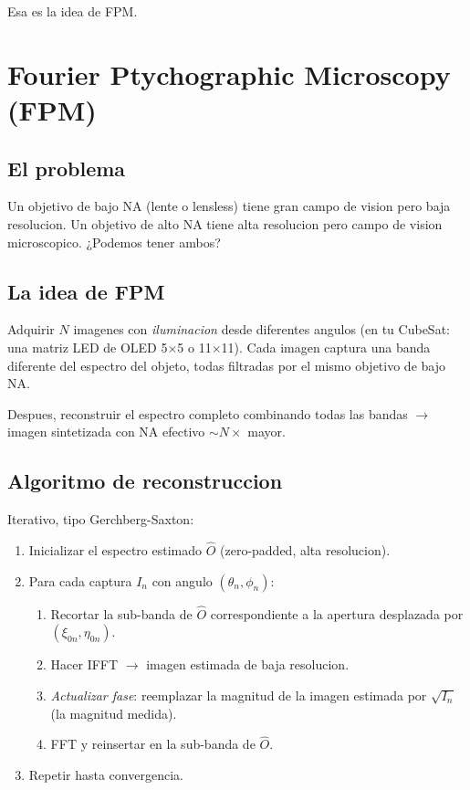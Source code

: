 \documentclass[11pt,a4paper,twoside,openright]{book}
\begin{document}
Esa es la idea de FPM.

\chapter{Fourier Ptychographic Microscopy (FPM)}
\label{ch:fpm}

\section{El problema}

Un objetivo de bajo NA (lente o lensless) tiene gran campo de vision pero baja resolucion. Un objetivo de alto NA tiene alta resolucion pero campo de vision microscopico. ¿Podemos tener ambos?

\section{La idea de FPM}

Adquirir $N$ imagenes con \emph{iluminacion} desde diferentes angulos (en tu CubeSat: una matriz LED de OLED 5$\times$5 o 11$\times$11). Cada imagen captura una banda diferente del espectro del objeto, todas filtradas por el mismo objetivo de bajo NA.

Despues, reconstruir el espectro completo combinando todas las bandas $\to$ imagen sintetizada con NA efectivo $\sim N\times$ mayor.

\section{Algoritmo de reconstruccion}

Iterativo, tipo Gerchberg-Saxton:

\begin{enumerate}[leftmargin=2em]
  \item Inicializar el espectro estimado $\hat{O}$ (zero-padded, alta resolucion).
  \item Para cada captura $I_n$ con angulo $(\theta_n, \phi_n)$:
    \begin{enumerate}[label=\alph*., leftmargin=2em]
      \item Recortar la sub-banda de $\hat{O}$ correspondiente a la apertura desplazada por $(\xi_{0n}, \eta_{0n})$.
      \item Hacer IFFT $\to$ imagen estimada de baja resolucion.
      \item \emph{Actualizar fase}: reemplazar la magnitud de la imagen estimada por $\sqrt{I_n}$ (la magnitud medida).
      \item FFT y reinsertar en la sub-banda de $\hat{O}$.
    \end{enumerate}
  \item Repetir hasta convergencia.
\end{enumerate}
\end{document}
